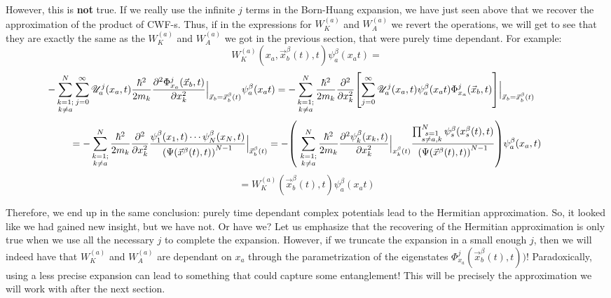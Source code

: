 \documentclass[11pt, a4paper]{article} %
\newcommand{\s}{\mathbb{S}}
\newcommand{\U}{\mathscr{U}}
\begin{document}
However, this is {\bf not} true. If we really use the infinite $j$ terms in the Born-Huang expansion, we have just seen above that we recover the approximation of the product of CWF-s. Thus, if in the expressions for $W^{(a)}_K$ and $W^{(a)}_A$ we revert the operations, we will get to see that they are exactly the same as the $W^{(a)}_K$ and $W^{(a)}_A$ we got in the previous section, that were purely time dependant. For example:\vspace{+0.1cm}
$$
W_K^{(a)}(x_a, \vec{x}_b^\beta (t),t)\psi_a^\beta(x_a t)=
$$
$$
\hspace{-1.1cm}- \sum_{\substack{k=1; \\ k\neq a}}^{N} \sum_{j=0}^\infty \U^j_a(x_a,t) \frac{\hbar^2}{2m_k} \pdv[2]{ \Phi_{x_a}^j(\vec{x}_b,t)}{x_k}\Big\rvert_{\vec{x}_b=\vec{x}_b^\beta(t)} \psi_a^\beta(x_a t)=- \sum_{\substack{k=1; \\ k\neq a}}^{N}  \frac{\hbar^2}{2m_k} \pdv[2]{}{x_k}\qty[\sum_{j=0}^\infty  \U^j_a(x_a,t)\psi_a^\beta(x_a t) \Phi_{x_a}^j(\vec{x}_b,t)]\Big\rvert_{\vec{x}_b=\vec{x}_b^\beta(t)}
$$
$$
=- \sum_{\substack{k=1; \\ k\neq a}}^{N}  \frac{\hbar^2}{2m_k} \pdv[2]{}{x_k} \frac{\psi^\beta_1(x_1,t)\cdots \psi^\beta_N(x_N,t)}{\qty(\Psi(\vec{x}^\beta(t),t))^{N-1}} \Big\rvert_{\vec{x}_b^\beta(t)}=- \qty(\ \sum_{\substack{k=1; \\ k\neq a}}^{N} \frac{\hbar^2}{2m_k}\pdv[2]{\psi_k^\beta(x_k,t)}{x_k}\Big\rvert_{x_k^\beta(t)}\frac{\prod_{\substack{s=1\\s\neq a,k}}^{N} \psi_s^\beta(x_s^\beta(t),t) }{\qty(\Psi(\vec{x}^\beta(t),t))^{N-1}} )\psi_a^\beta(x_a,t) 
$$
$$
=W_K^{(a)}(\vec{x}_b^\beta (t),t)\psi_a^\beta(x_a t)
$$

Therefore, we end up in the same  conclusion: purely time dependant complex potentials lead to the Hermitian approximation. So, it looked like we had gained new insight, but we have not. Or have we? Let us emphasize that the recovering of the Hermitian approximation is only true when we use all the necessary $j$ to complete the expansion. However, if we truncate the expansion in a small enough $j$, then we will indeed have that $W^{(a)}_K$ and $W^{(a)}_A$ are dependant on $x_a$ through the parametrization of the eigenstates $\Phi_{x_a}^j(\vec{x}_b^\beta(t),t))$! Paradoxically, using a less precise expansion can lead to something that could capture some entanglement! This will be precisely the approximation we will work with after the next section.
\end{document}
